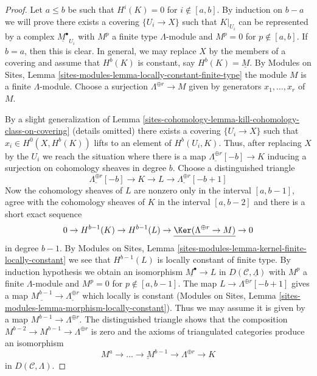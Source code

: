 \begin{proof}
Let $a \leq b$ be such that $H^i(K) = 0$ for $i \not \in [a, b]$.
By induction on $b - a$ we will prove there exists a covering
$\{U_i \to X\}$ such that $K|_{U_i}$ can be represented by a complex
$\underline{M^\bullet}_{U_i}$ with $M^p$ a finite type $\Lambda$-module
and $M^p = 0$ for $p \not \in [a, b]$. If $b = a$, then
this is clear. In general, we may replace $X$ by the members
of a covering and assume that $H^b(K)$ is constant, say
$H^b(K) = \underline{M}$. By Modules on Sites, Lemma
\ref{sites-modules-lemma-locally-constant-finite-type}
the module $M$ is a finite $\Lambda$-module. Choose a surjection
$\Lambda^{\oplus r} \to M$ given by generators $x_1, \ldots, x_r$
of $M$.

\medskip\noindent
By a slight generalization of
Lemma \ref{sites-cohomology-lemma-kill-cohomology-class-on-covering} (details omitted)
there exists a covering $\{U_i \to X\}$ such that $x_i \in H^0(X, H^b(K))$
lifts to an element of $H^b(U_i, K)$. Thus, after replacing $X$ by the
$U_i$ we reach the situation where there is a map
$\underline{\Lambda^{\oplus r}}[-b] \to K$
inducing a surjection on cohomology sheaves in degree $b$.
Choose a distinguished triangle
$$
\underline{\Lambda^{\oplus r}}[-b] \to K \to L \to
\underline{\Lambda^{\oplus r}}[-b + 1]
$$
Now the cohomology sheaves of $L$ are nonzero only in the interval
$[a, b - 1]$, agree with the cohomology sheaves of $K$ in the interval
$[a, b - 2]$ and there is a short exact sequence
$$
0 \to H^{b - 1}(K) \to H^{b - 1}(L) \to
\underline{\Ker(\Lambda^{\oplus r} \to M)} \to 0
$$
in degree $b - 1$. By
Modules on Sites, Lemma
\ref{sites-modules-lemma-kernel-finite-locally-constant}
we see that $H^{b - 1}(L)$ is locally constant of finite type.
By induction hypothesis we obtain an isomorphism
$\underline{M^\bullet} \to L$ in $D(\mathcal{C}, \underline{\Lambda})$
with $M^p$ a finite $\Lambda$-module and $M^p = 0$ for
$p \not \in [a, b - 1]$. The map $L \to \Lambda^{\oplus r}[-b + 1]$
gives a map $\underline{M^{b - 1}} \to \underline{\Lambda^{\oplus r}}$
which locally is constant
(Modules on Sites, Lemma
\ref{sites-modules-lemma-morphism-locally-constant}).
Thus we may assume it is given by a map $M^{b - 1} \to \Lambda^{\oplus r}$.
The distinguished triangle shows that the composition
$M^{b - 2} \to M^{b - 1} \to \Lambda^{\oplus r}$ is zero
and the axioms of triangulated categories produce an isomorphism
$$
\underline{M^a \to \ldots \to M^{b - 1} \to \Lambda^{\oplus r}}
\longrightarrow K
$$
in $D(\mathcal{C}, \Lambda)$.
\end{proof}

